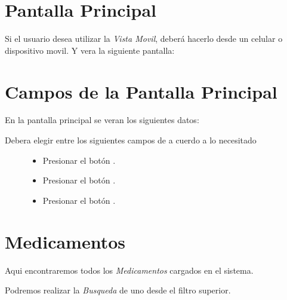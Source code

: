\documentclass[a4paper,10pt,spanish]{sphinxmanual}
\begin{document}
\section{Pantalla Principal}
\label{vistamovil:pantalla-principal}\label{vistamovil:pantalla-princ}
Si el usuario desea utilizar la \emph{Vista Movil}, deberá hacerlo desde un celular o dispositivo movil. Y vera la siguiente pantalla:



\section{Campos de la Pantalla Principal}
\label{vistamovil:campos-de-la-pantalla-principal}
En la pantalla principal se veran los siguientes datos:
\begin{description}
\item[{Debera elegir entre los siguientes campos de a cuerdo a lo necesitado}] \leavevmode\begin{itemize}
\item {} 
Presionar el botón .

\item {} 
Presionar el botón .

\item {} 
Presionar el botón .

\end{itemize}

\end{description}


\section{Medicamentos}
\label{vistamovil:medicamentos}\label{vistamovil:id1}
Aqui encontraremos todos los \emph{Medicamentos} cargados en el sistema.


Podremos realizar la \emph{Busqueda} de uno desde el filtro superior.

\end{document}
